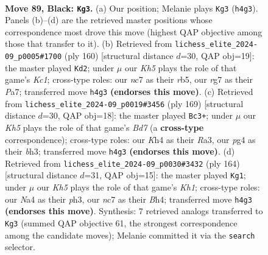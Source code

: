 \documentclass[11pt]{article}
\begin{document}
\clearpage

\begin{figure}[p]\centering
\begin{subfigure}{0.46\textwidth}\centering
\resizebox{\linewidth}{!}{%
\newchessgame
\chessboard[
  setfen={8/2N3R1/2b5/5P2/np4Pk/8/8/5BK1 b - - 1 89},
  showmover=false,
  pgfstyle=straightmove, color=movearrow, markmove={h4-g3}
]}
\caption{}
\end{subfigure}\hfill
\begin{subfigure}{0.46\textwidth}\centering
\resizebox{\linewidth}{!}{%
\newchessgame
\chessboard[
  setfen={n7/P7/8/1r6/3B4/1k6/2p5/2K5 w - - 8 81},
  showmover=false,
  pgfstyle=straightmove, color=movearrow, markmove={c1-d2}
]}
\caption{}
\end{subfigure}
\\[4pt]
\begin{subfigure}{0.46\textwidth}\centering
\resizebox{\linewidth}{!}{%
\newchessgame
\chessboard[
  setfen={5k2/8/5K2/p7/P4P1R/r6B/3b4/8 b - - 4 85},
  showmover=false,
  pgfstyle=straightmove, color=movearrow, markmove={d2-c3}
]}
\caption{}
\end{subfigure}\hfill
\begin{subfigure}{0.46\textwidth}\centering
\resizebox{\linewidth}{!}{%
\newchessgame
\chessboard[
  setfen={8/3k4/5R2/4rp2/6pB/7p/8/7K w - - 62 83},
  showmover=false,
  pgfstyle=straightmove, color=movearrow, markmove={h1-g1}
]}
\caption{}
\end{subfigure}
\caption{\textbf{Move 89, Black: \texttt{Kg3}.} (a) Our position; Melanie plays \texttt{Kg3} (\texttt{h4g3}). Panels (b)--(d) are the retrieved master positions whose correspondence most drove this move (highest QAP objective among those that transfer to it). (b) Retrieved from \texttt{lichess\_elite\_2024-09\_p0005\#1700} (ply 160) [structural distance $d$=30, QAP obj=19]: the master played \texttt{Kd2}; under $\mu$ our \emph{Kh5} plays the role of that game's \emph{Kc1}; cross-type roles: our \emph{n}c7 as their \emph{r}b5, our \emph{r}g7 as their \emph{P}a7; transferred move \texttt{h4g3} \textbf{(endorses this move)}. (c) Retrieved from \texttt{lichess\_elite\_2024-09\_p0019\#3456} (ply 169) [structural distance $d$=30, QAP obj=18]: the master played \texttt{Bc3+}; under $\mu$ our \emph{Kh5} plays the role of that game's \emph{Bd7} (a \textbf{cross-type} correspondence); cross-type roles: our \emph{K}h4 as their \emph{R}a3, our \emph{p}g4 as their \emph{b}h3; transferred move \texttt{h4g3} \textbf{(endorses this move)}. (d) Retrieved from \texttt{lichess\_elite\_2024-09\_p0030\#3432} (ply 164) [structural distance $d$=31, QAP obj=15]: the master played \texttt{Kg1}; under $\mu$ our \emph{Kh5} plays the role of that game's \emph{Kh1}; cross-type roles: our \emph{N}a4 as their \emph{p}h3, our \emph{n}c7 as their \emph{B}h4; transferred move \texttt{h4g3} \textbf{(endorses this move)}. Synthesis: 7 retrieved analogs transferred to \texttt{Kg3} (summed QAP objective 61, the strongest correspondence among the candidate moves); Melanie committed it via the \texttt{search} selector.}
\label{fig:thought-m177}
\end{figure}
\end{document}
